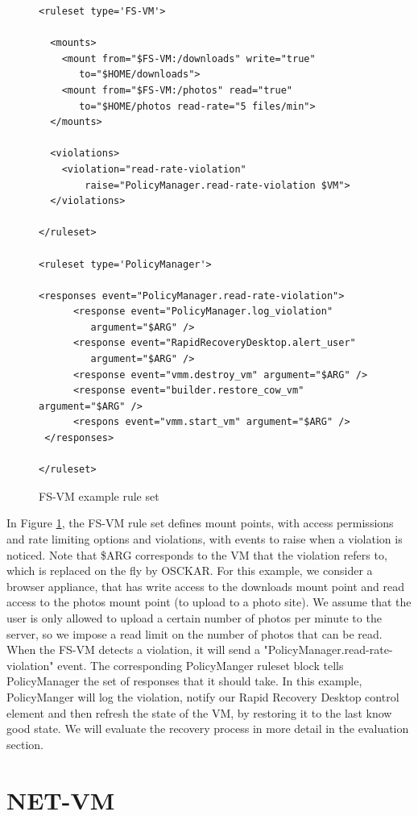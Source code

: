 \begin{figure}[tbp]
\caption{FS-VM example rule set}
\label{lst:fs_vm}

\begin{lstlisting}
<ruleset type='FS-VM'>

  <mounts>
    <mount from="$FS-VM:/downloads" write="true"
       to="$HOME/downloads">
    <mount from="$FS-VM:/photos" read="true" 
       to="$HOME/photos read-rate="5 files/min">
  </mounts>

  <violations>
    <violation="read-rate-violation" 
        raise="PolicyManager.read-rate-violation $VM">
  </violations>

</ruleset>

<ruleset type='PolicyManager'>

<responses event="PolicyManager.read-rate-violation">
      <response event="PolicyManager.log_violation" 
         argument="$ARG" />
      <response event="RapidRecoveryDesktop.alert_user" 
         argument="$ARG" />      
      <response event="vmm.destroy_vm" argument="$ARG" />
      <response event="builder.restore_cow_vm" argument="$ARG" />
      <respons event="vmm.start_vm" argument="$ARG" />
 </responses>

</ruleset>
\end{lstlisting}
\end{figure}

In Figure \ref{lst:fs_vm}, the FS-VM rule set defines mount points, with access permissions and rate limiting options and violations, with events to raise when a violation is noticed. Note that \$ARG corresponds to the VM that the violation refers to, which is replaced on the fly by OSCKAR. For this example, we consider a browser appliance, that has write access to the downloads mount point and read access to the photos mount point (to upload to a photo site). We assume that the user is only allowed to upload a certain number of photos per minute to the server, so we impose a read limit on the number of photos that can be read. When the FS-VM detects a violation, it will send a "PolicyManager.read-rate-violation" event. The corresponding PolicyManger ruleset block tells PolicyManager the set of responses that it should take. In this example, PolicyManger will log the violation, notify our Rapid Recovery Desktop control element and then refresh the state of the VM, by restoring it to the last know good state. We will evaluate the recovery process in more detail in the evaluation section.

\section{NET-VM}
\label{sec:net-vm-implementation}

